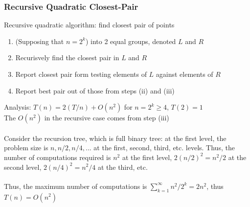 \documentclass{article}
\begin{document}
			\subsubsection{Recursive Quadratic Closest-Pair}
				Recursive quadratic algorithm: find closest pair of points
				\begin{enumerate}[i]
					\item (Supposing that $n = 2^k$) into 2 equal groups, denoted $L$ and $R$
					\item Recurisvely find the closest pair in $L$ and $R$
					\item Report closest pair form testing elements of $L$ against elements of $R$
					\item Report best pair out of those from steps (ii) and (iii)
					\end{enumerate}
				Analysis: $T(n) = 2(T/n) + O(n^2)$ for $n = 2^k \geq 4$, $T(2) = 1$ \\
				The $O(n^2)$ in the recursive case comes from step (iii) \\
				\\
				Consider the recursion tree, which is full binary tree: at the first level, the problem size is $n, n/2, n/4, ...$ at the first, second, third, etc. levels. Thus, the number of computations required is $n^2$ at the first level, $2(n/2)^2 = n^2/2$ at the second level, $2(n/4)^2 = n^2/4$ at the third, etc. \\
				\\
				Thus, the maximum number of computations is $\sum_{k = 1}^\infty n^2/2^k = 2n^2$, thus $T(n) = O(n^2)$






	\appendix


	
\end{document}
